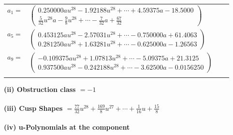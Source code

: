 \documentclass[1p]{elsarticle_modified}
\theoremstyle{definition}
\begin{document}
\begin{tabular}{m{7pt} m{180pt} m{7pt} m{180pt} }
\flushright $a_{1}=$&$\begin{pmatrix}0.250000 a u^{28}-1.92188 u^{28}+\cdots+4.59375 a-18.5000\\\frac{5}{32} u^{28} a-\frac{9}{8} u^{28}+\cdots-\frac{7}{32} a+\frac{67}{32}\end{pmatrix}$ \\
\flushright $a_{5}=$&$\begin{pmatrix}0.453125 a u^{28}-2.57031 u^{28}+\cdots-0.750000 a+61.4063\\0.281250 a u^{28}+1.63281 u^{28}+\cdots-0.625000 a-1.26563\end{pmatrix}$ \\
\flushright $a_{9}=$&$\begin{pmatrix}-0.109375 a u^{28}+1.07813 u^{28}+\cdots-5.09375 a+21.3125\\0.937500 a u^{28}-0.242188 u^{28}+\cdots-3.62500 a-0.0156250\end{pmatrix}$\\&\end{tabular}
\flushleft \textbf{(ii) Obstruction class $= -1$}\\~\\
\flushleft \textbf{(iii) Cusp Shapes $= \frac{77}{32} u^{28}+\frac{169}{8} u^{27}+\cdots+\frac{1}{16} u+\frac{15}{8}$}\\~\\
\newpage\renewcommand{\arraystretch}{1}
\flushleft \textbf{(iv) u-Polynomials at the component}\newline \\
\end{document}
